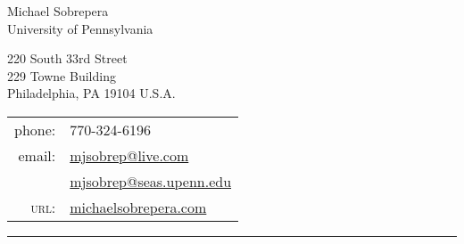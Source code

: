 \begin{center}
    {\LARGE Michael Sobrepera}\\[.5cm]
    University of Pennsylvania\\
    \begin{minipage}[c]{.35\textwidth}
    220 South 33rd Street\\
    229 Towne Building\\
    Philadelphia, PA 19104 U.S.A.\\[.2cm]
    \end{minipage}
    \begin{minipage}[c]{.35\textwidth}
    \begin{tabular}{r l}
    phone: & 770-324-6196\\
    email: & \href{mailto:mjsobrep@live.com}{mjsobrep@live.com}\\
           & \href{mailto:mjsobrep@seas.upenn.edu}{mjsobrep@seas.upenn.edu}\\
    \textsc{url}: & \href{http://michaelsobrepera.com}{michaelsobrepera.com}\\ 
    \end{tabular}
    \end{minipage}
    \end{center}
    \hrule
    \vspace{.4cm}